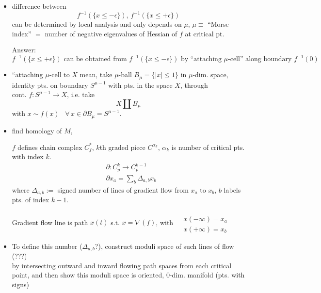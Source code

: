 \begin{itemize}
\item difference between
  \[
f^{-1}(\lbrace x \leq -\epsilon \rbrace) , \, f^{-1}(\lbrace x \leq + \epsilon \rbrace)
\]
can be determined by local analysis and only depends on $\mu$, $\mu \equiv $ ``Morse index'' $=$ number of negative eigenvalues of Hessian of $f$ at critical pt.

Answer: \\

\[
f^{-1}(\lbrace x \leq + \epsilon \rbrace) \text{ can be obtained from } f^{-1}(\lbrace x \leq -\epsilon \rbrace) \text{ by ``attaching $\mu$-cell'' along boundary $f^{-1}(0)$ }
\]

\item ``attaching $\mu$-cell to $X$ mean, take
  $\mu$-ball $B_{\mu} = \lbrace |x| \leq 1 \rbrace$ in $\mu$-dim. space, \\
  identity pts. on boundary $S^{\mu-1}$ with pts. in the space $X$, through \\
  cont. $f : S^{\mu-1} \to X$, i.e. take
  \[
X \coprod B_{\mu}
\]
with $x\sim f(x)$ \, $\forall \, x \in \partial B_{\mu} = S^{\mu -1}$.

 
\item find homology of $M$,
  
  $f$ defines chain complex $C_f^*$, $k$th graded piece $C^{\alpha_k}$, $\alpha_k$ is number of critical pts. with index $k$.
  \begin{equation}
\begin{aligned}
  & \partial : C_p^k \to C^{k-1}_p \\ 
  & \partial x_a = \sum_b \Delta_{a,b} x_b 
  \end{aligned}
    \end{equation}
  where $\Delta_{a,b} :=$ signed number of lines of gradient flow from $x_a$ to $x_b$, $b$ labels pts. of index $k-1$.

  Gradient flow line is path $x(t)$ s.t. $\dot{x} = \nabla (f)$, with $\begin{aligned} & \quad  \\
    & x(-\infty) = x_a \\
    & x(+\infty) = x_b \end{aligned}$

\item  To define this number ($\Delta_{a,b} $?), construct moduli space of such lines of flow (???) \\
  by intersecting outward and inward flowing path spaces from each critical point, and then show this moduli space is oriented, 0-dim. manifold (pts. with signs)


\end{itemize}
